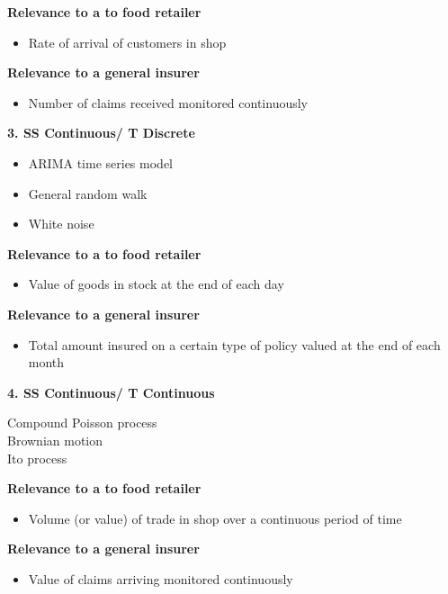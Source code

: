 \documentclass[a4paper,12pt]{article}
\begin{document}
\noindent \textbf{Relevance to a  to food retailer }
\begin{itemize}
\item Rate of arrival of
customers in shop
\end{itemize}
\noindent \textbf{Relevance to a general insurer}
\begin{itemize}
\item Number of claims
received monitored
continuously
\end{itemize}

\noindent \textbf{3. SS Continuous/
T Discrete}
\begin{itemize}
\item ARIMA time series model 
\item General random walk 
\item White noise 
\end{itemize}
\noindent \textbf{Relevance to a  to food retailer }
\begin{itemize}
\item Value of goods in
stock at the end of
each day
\end{itemize}
\noindent \textbf{Relevance to a general insurer}
\begin{itemize}
\item Total amount insured
on a certain type of
policy valued at the
end of each month
\end{itemize}
\noindent \textbf{4. SS Continuous/
T Continuous }
\begin{itemize}
Compound Poisson process \\ Brownian motion \\ Ito process
\end{itemize}

\noindent \textbf{Relevance to a  to food retailer }
\begin{itemize}
\item Volume (or value) of
trade in shop over a
continuous period of
time
\end{itemize}

\noindent \textbf{Relevance to a general insurer}
\begin{itemize}
\item Value of claims
arriving monitored
continuously
\end{itemize}
\end{document}
